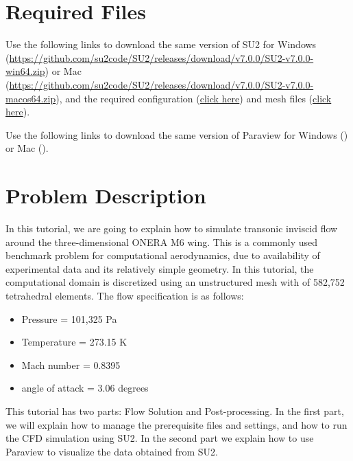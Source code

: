 \section{Required Files}
\begin{su2note}
	Use the following links to download the same version of SU2 for Windows (\href{}{https://github.com/su2code/SU2/releases/download/v7.0.0/SU2-v7.0.0-win64.zip}) or Mac (\href{}{https://github.com/su2code/SU2/releases/download/v7.0.0/SU2-v7.0.0-macos64.zip}), and the required configuration (\href{}{click here}) and mesh files (\href{}{click here}).
\end{su2note}
\begin{paraviewnote}
	Use the following links to download the same version of Paraview for Windows (\href{}{}) or Mac (\href{}{}).
\end{paraviewnote}
\section{Problem Description}
In this tutorial, we are going to explain how to simulate transonic inviscid flow around the three-dimensional ONERA M6 wing. This is a commonly used benchmark problem for computational aerodynamics, due to availability of experimental data and its relatively simple geometry. In this tutorial, the computational domain is discretized using an unstructured mesh with of 582,752 tetrahedral elements. The flow specification is as follows:
\begin{itemize}
    \item Pressure = 101,325 Pa
    \item Temperature = 273.15 K
    \item Mach number = 0.8395
    \item angle of attack = 3.06 degrees
\end{itemize}

This tutorial has two parts: Flow Solution and Post-processing. In the first part, we will explain how to manage the prerequisite files and settings, and how to run the CFD simulation using SU2. In the second part we explain how to use Paraview to visualize the data obtained from SU2.
